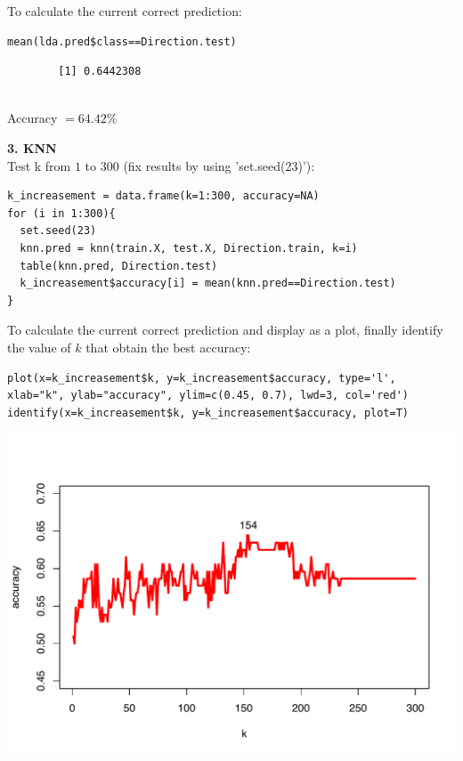 \documentclass[twoside,11pt]{homework}
\begin{document}
\begin{enumerate}
\begin{verbatim}
		\end{verbatim}
		
		To calculate the current correct prediction:
		
		\begin{lstlisting}
mean(lda.pred$class==Direction.test)
		\end{lstlisting}
		
		\begin{verbatim}
		[1] 0.6442308
		
		\end{verbatim}
		
		Accuracy $=64.42\%$
		
		\textbf{3. KNN}\\
		Test k from $1$ to $300$ (fix results by using 'set.seed(23)'):\\
		
		\begin{lstlisting}
k_increasement = data.frame(k=1:300, accuracy=NA)
for (i in 1:300){
  set.seed(23)
  knn.pred = knn(train.X, test.X, Direction.train, k=i)
  table(knn.pred, Direction.test)
  k_increasement$accuracy[i] = mean(knn.pred==Direction.test)
}
		\end{lstlisting}
		
		To calculate the current correct prediction and display as a plot, finally identify the value of $k$ that obtain the best accuracy:
		
		\begin{lstlisting}
plot(x=k_increasement$k, y=k_increasement$accuracy, type='l', xlab="k", ylab="accuracy", ylim=c(0.45, 0.7), lwd=3, col='red')
identify(x=k_increasement$k, y=k_increasement$accuracy, plot=T)
		\end{lstlisting}
		
		\begin{center}
		\includegraphics[height=0.5\textheight]{f2.pdf}
		\end{center}
		

\end{enumerate}
\end{document}
